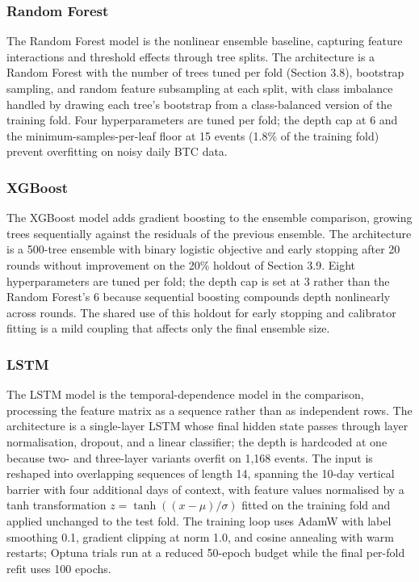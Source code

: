 \subsubsection{Random Forest}\label{subsubsec:rf}

The Random Forest model \citep{breiman_2001} is the nonlinear ensemble baseline, capturing feature interactions and threshold effects through tree splits. The architecture is a Random Forest with the number of trees tuned per fold (Section 3.8), bootstrap sampling, and random feature subsampling at each split, with class imbalance handled by drawing each tree's bootstrap from a class-balanced version of the training fold. Four hyperparameters are tuned per fold; the depth cap at 6 and the minimum-samples-per-leaf floor at 15 events (1.8\% of the training fold) prevent overfitting on noisy daily BTC data.


\subsubsection{XGBoost}\label{subsubsec:xgb}

The XGBoost model \citep{chen_guestrin_2016} adds gradient boosting to the ensemble comparison, growing trees sequentially against the residuals of the previous ensemble. The architecture is a 500-tree ensemble with binary logistic objective and early stopping after 20 rounds without improvement on the 20\% holdout of Section 3.9. Eight hyperparameters are tuned per fold; the depth cap is set at 3 rather than the Random Forest's 6 because sequential boosting compounds depth nonlinearly across rounds. The shared use of this holdout for early stopping and calibrator fitting is a mild coupling that affects only the final ensemble size.


\subsubsection{LSTM}\label{subsubsec:lstm}

The LSTM model \citep{hochreiter_schmidhuber_1997} is the temporal-dependence model in the comparison, processing the feature matrix as a sequence rather than as independent rows. The architecture is a single-layer LSTM whose final hidden state passes through layer normalisation, dropout, and a linear classifier; the depth is hardcoded at one because two- and three-layer variants overfit on 1,168 events. The input is reshaped into overlapping sequences of length 14, spanning the 10-day vertical barrier with four additional days of context, with feature values normalised by a tanh transformation $z = \tanh((x - \mu) / \sigma)$ fitted on the training fold and applied unchanged to the test fold. The training loop uses AdamW \citep{loshchilov_adamw_2019} with label smoothing 0.1, gradient clipping at norm 1.0, and cosine annealing with warm restarts; Optuna trials run at a reduced 50-epoch budget while the final per-fold refit uses 100 epochs.


